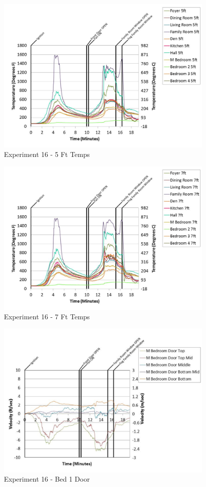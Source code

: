 \documentclass{article}
\begin{document}
\begin{appendices}
	\begin{figure}[h!]
		\centering
		\includegraphics[height=3.05in]{0_Images/Results_Charts/Exp_16_Charts/5FtTemps.pdf}
		\caption{Experiment 16 - 5 Ft Temps}
	\end{figure}
 

	\begin{figure}[h!]
		\centering
		\includegraphics[height=3.05in]{0_Images/Results_Charts/Exp_16_Charts/7FtTemps.pdf}
		\caption{Experiment 16 - 7 Ft Temps}
	\end{figure}
 
	\clearpage

	\begin{figure}[h!]
		\centering
		\includegraphics[height=3.05in]{0_Images/Results_Charts/Exp_16_Charts/Bed1Door.pdf}
		\caption{Experiment 16 - Bed 1 Door}
	\end{figure}
 


\end{appendices}
\end{document}
